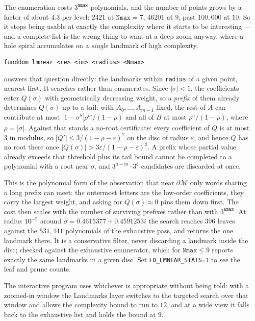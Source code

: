\documentclass{amsart}
\begin{document}
The enumeration costs $3^{\texttt{Nmax}}$ polynomials, and the number of points grows by a factor
of about $4.3$ per level: $2421$ at $\texttt{Nmax}=7$, $46201$ at $9$, past $100{,}000$ at $10$.
So it stops being usable at exactly the complexity where it starts to be interesting --- and a
complete list is the wrong thing to want at a deep zoom anyway, where a hole spiral accumulates on
a \emph{single} landmark of high complexity.

\label{sec:lmnear-doc}
\begin{verbatim}
funddom lmnear <re> <im> <radius> <Nmax>
\end{verbatim}

answers that question directly: the landmarks within \texttt{radius} of a given point, nearest
first.  It searches rather than enumerates.  Since $|\sigma| < 1$, the coefficients enter
$Q(\sigma)$ with geometrically decreasing weight, so a \emph{prefix} of them already determines
$Q(\sigma)$ up to a tail: with $A_0,\dots,A_{m-1}$ fixed, the rest of $A$ can contribute at most
$|1-\sigma^b|\rho^m/(1-\rho)$ and all of $B$ at most $\rho^a/(1-\rho)$, where $\rho=|\sigma|$.
Against that stands a no-root certificate: every coefficient of $Q$ is at most $3$ in modulus, so
$|Q'| \le 3/(1-\rho-\varepsilon)^2$ on the disc of radius $\varepsilon$, and hence $Q$ has no
root there once $|Q(\sigma)| > 3\varepsilon/(1-\rho-\varepsilon)^2$.  A prefix whose partial value
already exceeds that threshold plus its tail bound cannot be completed to a polynomial with a root
near $\sigma$, and $3^{a-m}\cdot 3^{b}$ candidates are discarded at once.

This is the polynomial form of the observation that near $\partial\mathcal{M}$ only words sharing a
long prefix can meet: the outermost letters are the low-order coefficients, they carry the largest
weight, and asking for $Q(\sigma)\approx 0$ pins them down first.  The cost then scales with the
number of surviving prefixes rather than with $3^{\texttt{Nmax}}$.  At radius $10^{-5}$ around
$\sigma = 0.4615377 + 0.4591253i$ the search reaches $396$ leaves against the $531{,}441$
polynomials of the exhaustive pass, and returns the one landmark there.  It is a conservative
filter, never discarding a landmark inside the disc; checked against the exhaustive enumerator,
which for $\texttt{Nmax} \le 9$ reports exactly the same landmarks in a given disc.  Set
\texttt{FD\_LMNEAR\_STATS=1} to see the leaf and prune counts.

The interactive program uses whichever is appropriate without being told: with a zoomed-in window
the Landmarks layer switches to the targeted search over that window and allows the complexity
bound to run to $12$, and at a wide view it falls back to the exhaustive list and holds the bound
at $9$.
\end{document}
